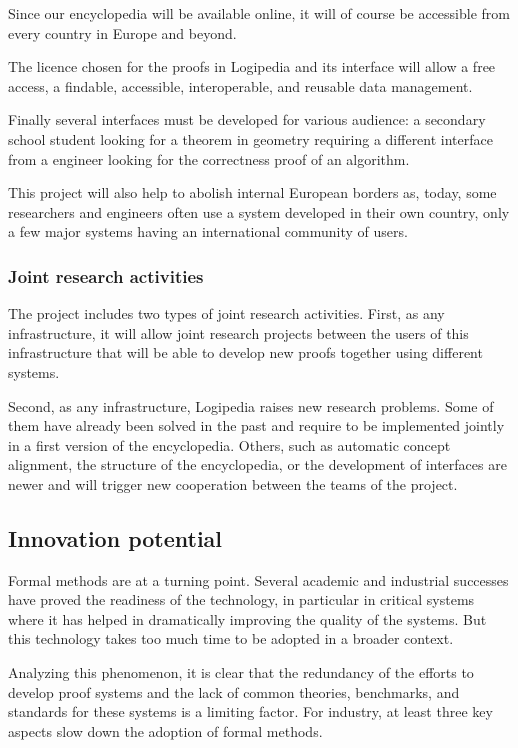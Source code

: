 Since our encyclopedia will be available online, it will of course be
accessible from every country in Europe and beyond.

The licence chosen for the proofs in {\sf Logipedia} and its interface
will allow a free access, a findable, accessible, interoperable, and
reusable data management.

Finally several interfaces must be developed for various audience: a
secondary school student looking for a theorem in geometry requiring a
different interface from a engineer looking for the correctness proof
of an algorithm.

This project will also help to abolish internal European borders as,
today, some researchers and engineers often use a system developed in
their own country, only a few major systems having an international
community of users.

\subsubsection{Joint research activities}

The project includes two types of joint research activities.  First,
as any infrastructure, it will allow joint research projects
between the users of this infrastructure that will be able to develop
new proofs together using different systems.

Second, as any infrastructure, {\sf Logipedia} raises new research
problems. Some of them have already been solved in the past and
require to be implemented jointly in a first version of the
encyclopedia. Others, such as automatic concept alignment, the
structure of the encyclopedia, or the development of interfaces are
newer and will trigger new cooperation between the teams of the
project.

\subsection{Innovation potential}


Formal methods are at a turning point. Several academic and
industrial successes have proved the readiness of the technology,
in particular in critical systems where it has helped in
dramatically improving the quality of the systems. But this
technology takes too much time to be adopted in a broader context.

Analyzing this phenomenon, it is clear that the redundancy of the
efforts to develop proof systems and the lack of common theories,
benchmarks, and standards for these systems is a limiting factor.
For industry, at least three key aspects slow down the adoption of
formal methods.

